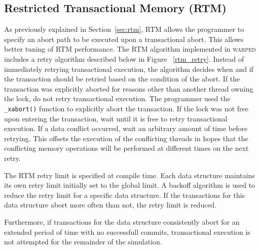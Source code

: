 \documentclass[11pt]{book}
\begin{document}
\subsection{Restricted Transactional Memory (RTM)}

As previously explained in Section~\ref{sec:rtm}, RTM allows the programmer to specify an
abort path to be executed upon a transactional abort.  This allows better tuning of RTM
performance.  The RTM algorithm implemented in \textsc{warped} includes a retry algorithm described
below in Figure ~\ref{rtm_retry}. Instead of immediately retrying transactional execution,
the algorithm decides when and if the transaction should be retried based on the condition
of the abort.  If the transaction was explicitly aborted for reasons other than another
thread owning the lock, do not retry transactional execution.  The programmer used the
\texttt{\_xabort()} function to explicitly abort the transaction. If the lock was not free
upon entering the transaction, wait until it is free to retry transactional execution.  If
a data conflict occurred, wait an arbitrary amount of time before retrying.  This offsets
the execution of the conflicting threads in hopes that the conflicting memory operations
will be performed at different times on the next retry.

The RTM retry limit is specified at compile time.  Each data structure maintains its own
retry limit initially set to the global limit.  A backoff algorithm is used to reduce the
retry limit for a specific data structure.  If the transactions for this data structure
abort more often than not, the retry limit is reduced.

Furthermore, if transactions for the data structure consistently abort for an extended
period of time with no successfull commits, transactional execution is not attempted for
the remainder of the simulation.
\end{document}
